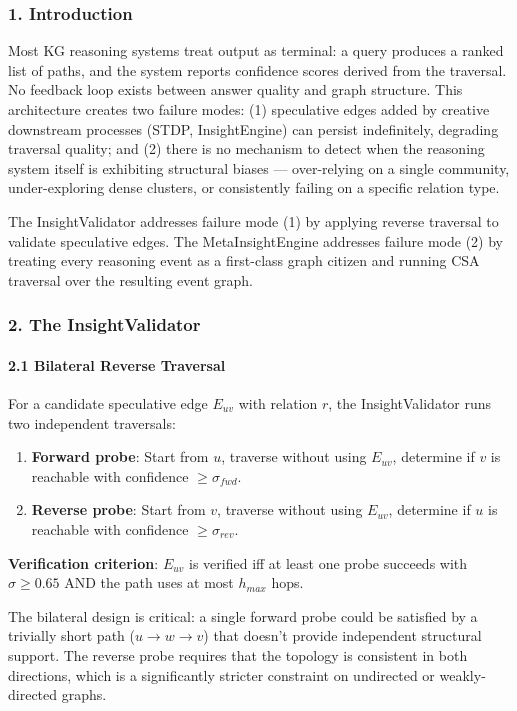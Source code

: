 \documentclass[10pt,journal,compsoc]{IEEEtran}
\begin{document}
\subsubsection{1. Introd\-uction}
Most KG reasoning systems treat output as terminal: a query produces a ranked list of paths, and the system reports confidence scores derived from the traversal. No feedback loop exists between answer quality and graph structure. This archi\-tecture creates two failure modes: (1) speculative edges added by creative downstream processes (STDP, InsightEngine) can persist indef\-initely, degrading traversal quality; and (2) there is no mechanism to detect when the reasoning system itself is exhibiting structural biases — over-relying on a single community, under-exploring dense clusters, or consi\-stently failing on a specific relation type.

The InsightValidator addresses failure mode (1) by applying reverse traversal to validate speculative edges. The MetaInsightEngine addresses failure mode (2) by treating every reasoning event as a first-class graph citizen and running CSA traversal over the resulting event graph.

\subsubsection{2. The InsightValidator}

\paragraph{2.1 Bilateral Reverse Traversal}
For a candidate speculative edge $E_{uv}$ with relation $r$, the InsightValidator runs two independent traversals:

\begin{enumerate}
\item \textbf{Forward probe}: Start from $u$, traverse without using $E_{uv}$, determine if $v$ is reachable with confidence $\geq \sigma_{fwd}$.
\item \textbf{Reverse probe}: Start from $v$, traverse without using $E_{uv}$, determine if $u$ is reachable with confidence $\geq \sigma_{rev}$.

\end{enumerate}
\textbf{Verifi\-cation criterion}: $E_{uv}$ is verified iff at least one probe succeeds with $\sigma \geq 0.65$ AND the path uses at most $h_{max}$ hops.

The bilateral design is critical: a single forward probe could be satisfied by a trivially short path ($u \to w \to v$) that doesn't provide independent structural support. The reverse probe requires that the topology is consistent in both directions, which is a signi\-ficantly stricter constraint on undirected or weakly-directed graphs.
\end{document}
